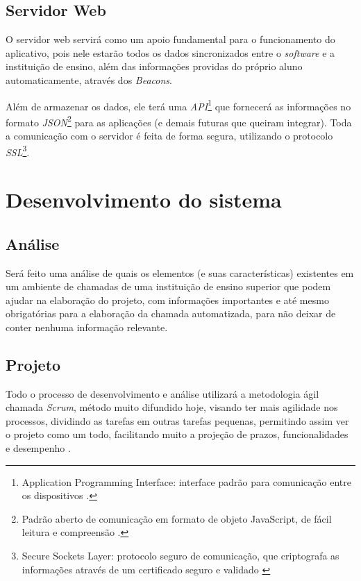 \documentclass[
	12pt,
	oneside,
	a4paper,
	english,
	brazil,
]{abntex2}
\begin{document}
\subsection{Servidor Web}

O servidor web servirá como um apoio fundamental para o funcionamento do aplicativo, pois nele estarão todos os dados sincronizados entre o \emph{software} e a instituição de ensino, além das informações providas do próprio aluno automaticamente, através dos \emph{Beacons}.

Além de armazenar os dados, ele terá uma \emph{API}\footnote{Application Programming Interface: interface padrão para comunicação entre os dispositivos \cite{footnote-api}.} que fornecerá as informações no formato \emph{JSON}\footnote{Padrão aberto de comunicação em formato de objeto JavaScript, de fácil leitura e compreensão \cite{footnote-json}.} para as aplicações (e demais futuras que queiram integrar). Toda a comunicação com o servidor é feita de forma segura, utilizando o protocolo \emph{SSL}\footnote{Secure Sockets Layer: protocolo seguro de comunicação, que criptografa as informações através de um certificado seguro e validado \cite{footnote-ssl}}. 

\section{Desenvolvimento do sistema}
\subsection{Análise}

Será feito uma análise de quais os elementos (e suas características) existentes em um ambiente de chamadas de uma instituição de ensino superior que podem ajudar na elaboração do projeto, com informações importantes e até mesmo obrigatórias para a elaboração da chamada automatizada, para não deixar de conter nenhuma informação relevante.

\subsection{Projeto}

Todo o processo de desenvolvimento e análise utilizará a metodologia ágil chamada \emph{Scrum}, método muito difundido hoje, visando ter mais agilidade nos processos, dividindo as tarefas em outras tarefas pequenas, permitindo assim ver o projeto como um todo, facilitando muito a projeção de prazos, funcionalidades e desempenho \cite{scrum}.
\end{document}
